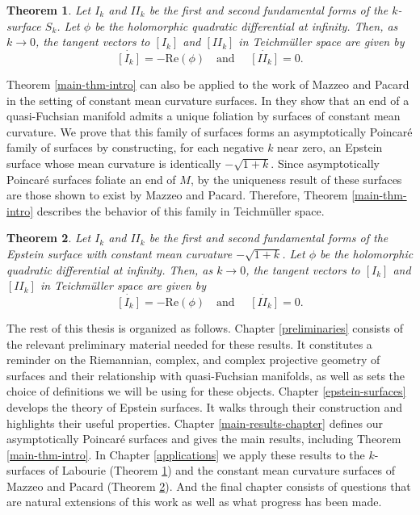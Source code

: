 \documentclass{amsart}
\newtheorem{bigthm}{Theorem}
\newcommand{\two}{I\!\!I}
\begin{document}
\begin{bigthm} \label{k-surfaces-intro}
Let $I_k$ and $\two_k$ be the first and second fundamental forms of the $k$-surface $S_k$. 
Let $\phi$ be the holomorphic quadratic differential at infinity. 
Then, as $k \to 0$, the tangent vectors to $[I_k]$ and $[\two_k]$ in Teichm\"uller space are given by 
\[
  \dot{[I_k]}= - \mathrm{Re}(\phi) \quad \text{and } \quad \dot{[\two_k]} = 0.
\]
\end{bigthm}

Theorem \ref{main-thm-intro} can also be applied to the work of Mazzeo and Pacard in the setting of constant mean curvature surfaces.
In \cite{mazzeo-pacard2011} they show that an end of a quasi-Fuchsian manifold admits a unique foliation by surfaces of constant mean curvature. 
We prove that this family of surfaces forms an asymptotically Poincar\'e family of surfaces by constructing, for each negative $k$ near zero, an Epstein surface whose mean curvature is identically $-\sqrt{1+k}$.
Since asymptotically Poincar\'e surfaces foliate an end of $M$, by the uniqueness result of \cite{mazzeo-pacard2011} these surfaces are those shown to exist by Mazzeo and Pacard.
Therefore, Theorem \ref{main-thm-intro} describes the behavior of this family in Teichm\"uller space.  

\begin{bigthm} \label{cmc-intro}
Let $I_k$ and $\two_k$ be the first and second fundamental forms of the Epstein surface with constant mean curvature $-\sqrt{1+k}$.
Let $\phi$ be the holomorphic quadratic differential at infinity. 
Then, as $k \to 0$, the tangent vectors to $[I_k]$ and $[\two_k]$ in Teichm\"uller space are given by 
\[
  \dot{[I_k]}= - \mathrm{Re}(\phi) \quad \text{and } \quad \dot{[\two_k]} = 0.
\]
\end{bigthm}

The rest of this thesis is organized as follows. 
Chapter \ref{preliminaries} consists of the relevant preliminary material needed for these results. 
It constitutes a reminder on the Riemannian, complex, and complex projective geometry of surfaces and their relationship with quasi-Fuchsian manifolds, as well as sets the choice of definitions we will be using for these objects. 
Chapter \ref{epstein-surfaces} develops the theory of Epstein surfaces.
It walks through their construction and highlights their useful properties. 
Chapter \ref{main-results-chapter} defines our asymptotically Poincar\'e surfaces and gives the main results, including Theorem \ref{main-thm-intro}.
In Chapter \ref{applications} we apply these results to the $k$-surfaces of Labourie (Theorem \ref{k-surfaces-intro}) and the constant mean curvature surfaces of Mazzeo and Pacard (Theorem \ref{cmc-intro}). 
And the final chapter consists of questions that are natural extensions of this work as well as what progress has been made.
\end{document}
